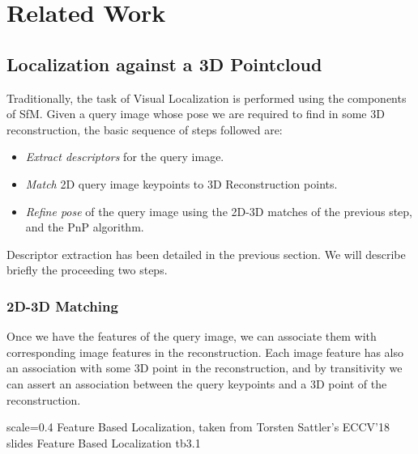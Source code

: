 

\chapter{Related Work}
\section{Localization against a 3D Pointcloud}
Traditionally, the task of Visual Localization is performed using the components of SfM. Given a query image whose pose we are required to find in some 3D reconstruction, the basic sequence of steps followed are:

\begin{itemize}
	\item \emph{Extract descriptors} for the query image.\\
	\item \textit{Match} 2D query image keypoints to 3D Reconstruction points.\\
	\item \textit{Refine pose} of the query image using the 2D-3D matches of the previous step, and the PnP algorithm.\\
\end{itemize}

Descriptor extraction has been detailed in the previous section. We will describe briefly the proceeding two steps. 

\subsection{2D-3D Matching}
Once we have the features of the query image, we can associate them with corresponding image features in the reconstruction. Each image feature has also an association with some 3D point in the reconstruction, and by transitivity we can assert an association between the query keypoints and a 3D point of the reconstruction.

{scale=0.4}%
{Feature Based Localization, taken from Torsten Sattler's ECCV'18 slides}%
{Feature Based Localization}%
{tb3.1} %

